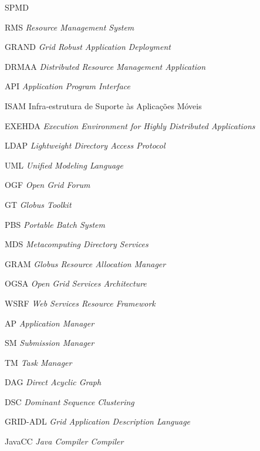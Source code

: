 
\tableofcontents


\begin{listofabbrv}{SPMD}
        \item[RMS]   \emph{Resource Management System}
        \item[GRAND] \emph{Grid Robust Application Deployment}
        \item[DRMAA] \emph{Distributed Resource Management Application}
        \item[API]   \emph{Application Program Interface}
        \item[ISAM]  Infra-estrutura de Suporte às Aplicações Móveis
        \item[EXEHDA]\emph{Execution Environment for Highly Distributed Applications}
        \item[LDAP]  \emph{Lightweight Directory Access Protocol}
        \item[UML]   \emph{Unified Modeling Language}
        \item[OGF]   \emph{Open Grid Forum}
        \item[GT]    \emph{Globus Toolkit}
        \item[PBS]   \emph{Portable Batch System}
        \item[MDS]   \emph{Metacomputing Directory Services}
        \item[GRAM]  \emph{Globus Resource Allocation Manager}
        \item[OGSA]  \emph{Open Grid Services Architecture}
        \item[WSRF]  \emph{Web Services Resource Framework}
        \item[AP]    \emph{Application Manager}
        \item[SM]    \emph{Submission Manager}
        \item[TM]    \emph{Task Manager}
        \item[DAG]	\emph{Direct Acyclic Graph}
        \item[DSC]	\emph{Dominant Sequence Clustering}
        \item[GRID-ADL] \emph{Grid Application Description Language}
        \item[JavaCC]\emph{Java Compiler Compiler}
\end{listofabbrv}


\listoffigures

\listoftables

